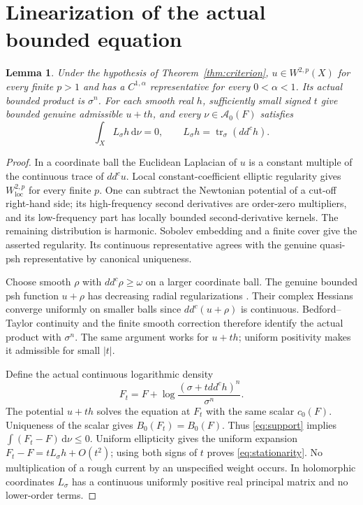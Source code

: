 \documentclass[11pt]{article}
\newcommand{\ddc}{dd^c}
\newcommand{\tr}{\operatorname{tr}}
\newcommand{\cA}{\mathcal A}
\newtheorem{lemma}[theorem]{Lemma}
\theoremstyle{remark}
\begin{document}
\section{Linearization of the actual bounded equation}
\begin{lemma}\label{lem:actual}
Under the hypothesis of Theorem~\ref{thm:criterion},
$u\in W^{2,p}(X)$ for every finite $p>1$ and has a $C^{1,\alpha}$
representative for every $0<\alpha<1$. Its actual bounded product is
$\sigma^n$. For each smooth real $h$, sufficiently small signed $t$
give bounded genuine admissible $u+th$, and every $\nu\in\cA_0(F)$ satisfies
\begin{equation}\label{eq:stationarity}
 \int_X L_\sigma h\,\mathrm d\nu=0,
 \qquad L_\sigma h=\tr_\sigma(\ddc h).
\end{equation}
\end{lemma}
\begin{proof}
In a coordinate ball the Euclidean Laplacian of $u$ is a constant multiple
of the continuous trace of $\ddc u$. Local constant-coefficient elliptic
regularity gives $W^{2,p}_{\mathrm{loc}}$ for every finite $p$.
One can subtract the Newtonian potential of a cut-off right-hand side;
its high-frequency second derivatives are order-zero multipliers, and
its low-frequency part has locally bounded second-derivative kernels.
The remaining distribution is harmonic. Sobolev embedding and a finite
cover give the asserted regularity. Its continuous representative agrees
with the genuine quasi-psh representative by canonical uniqueness.

Choose smooth $\rho$ with $\ddc\rho\geq\omega$ on a larger coordinate
ball. The genuine bounded psh function $u+\rho$ has decreasing radial
regularizations \cite{Dem}. Their complex Hessians converge uniformly
on smaller balls since $\ddc(u+\rho)$ is continuous. Bedford--Taylor
continuity \cite{BT} and the finite smooth correction therefore identify
the actual product with $\sigma^n$. The same argument works for $u+th$;
uniform positivity makes it admissible for small $|t|$.

Define the actual continuous logarithmic density
\[
 F_t=F+\log\frac{(\sigma+t\ddc h)^n}{\sigma^n}.
\]
The potential $u+th$ solves the equation at $F_t$ with the same scalar
$c_0(F)$. Uniqueness of the scalar gives $B_0(F_t)=B_0(F)$. Thus
\eqref{eq:support} implies $\int(F_t-F)\,\mathrm d\nu\leq0$.
Uniform ellipticity gives the uniform expansion
$F_t-F=tL_\sigma h+O(t^2)$; using both signs of $t$ proves
\eqref{eq:stationarity}. No multiplication of a rough current by an
unspecified weight occurs. In holomorphic coordinates $L_\sigma$ has
a continuous uniformly positive real principal matrix and no lower-order
terms.
\end{proof}
\end{document}
